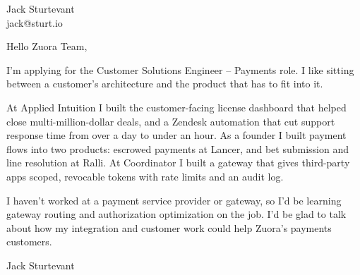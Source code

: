 \documentclass[11pt]{article}
\begin{document}
\raggedright

{\namefont\fontsize{20pt}{24pt}\selectfont Jack Sturtevant}\\[-0.3em]
jack@sturt.io

\vspace{1.2em}

Hello Zuora Team,

I'm applying for the Customer Solutions Engineer -- Payments role. I like sitting between a customer's architecture and the product that has to fit into it.

At Applied Intuition I built the customer-facing license dashboard that helped close multi-million-dollar deals, and a Zendesk automation that cut support response time from over a day to under an hour. As a founder I built payment flows into two products: escrowed payments at Lancer, and bet submission and line resolution at Ralli. At Coordinator I built a gateway that gives third-party apps scoped, revocable tokens with rate limits and an audit log.

I haven't worked at a payment service provider or gateway, so I'd be learning gateway routing and authorization optimization on the job. I'd be glad to talk about how my integration and customer work could help Zuora's payments customers.

\vspace{0.6em}
Jack Sturtevant
\end{document}

